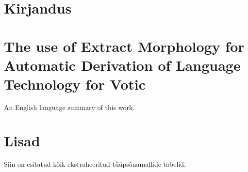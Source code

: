 \documentclass[12pt,a4paper]{article}
\begin{document}
\glsaddall
\small{
  \printglossary[title={},toctitle={}]
}








\newpage
\section{Kirjandus}
\label{sec:kirjandus}
{
  \renewcommand*{\bibfont}{\small}
  \printbibliography[heading=none]
}







\newpage
\section{The use of Extract Morphology for Automatic Derivation of Language Technology for Votic}

An English language summary of this work.







\newpage
\section{Lisad}

Siin on esitatud kõik ekstraheeritud tüüpsõnamallide tabelid.


\end{document}
